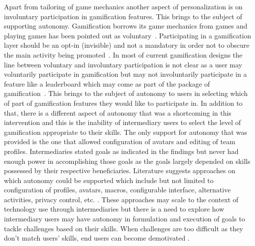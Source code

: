 Apart from tailoring of game mechanics another aspect of personalization is on involuntary participation in gamification features. This brings to the subject of supporting autonomy. Gamification borrows its game mechanics from games and playing games has been pointed out as voluntary~\citep{seaborn2015:gamification,knaving2013designing}. Participating in a gamification layer should be an opt-in (invisible) and not a mandatory in order not to obscure the main activity being promoted~\citep{knaving2013designing}. In most of current gamification designs the line between voluntary and involuntary participation is not clear as a user may voluntarily participate in gamification but may not involuntarily participate in a feature like a leaderboard which may come as part of the package of gamification~\citep{ferro2013towards}. This brings to the subject of autonomy to users in selecting which of part of gamification features they would like to participate in. In addition to that, there is a different aspect of autonomy that was a shortcoming in this intervention and this is the inability of intermediary users to select the level of gamification appropriate to their skills. The only support for autonomy that was provided is the one that allowed configuration of avatars and editing of team profiles. Intermediaries stated goals as indicated in the findings but never had enough power in accomplishing those goals as the goals largely depended on skills possessed by their respective beneficiaries. Literature suggests approaches on which autonomy could be supported which include but not limited to configuration of profiles, avatars, macros, configurable interface, alternative activities, privacy control, etc. \citep{francisco2012analysis}. These approaches may scale to the context of technology use through intermediaries but there is a need to explore how intermediary users may have autonomy in formulation and execution of goals to tackle challenges based on their skills. When challenges are too difficult as they don't match users' skills, end users can become demotivated \citep{zhang2008motivational}.    

